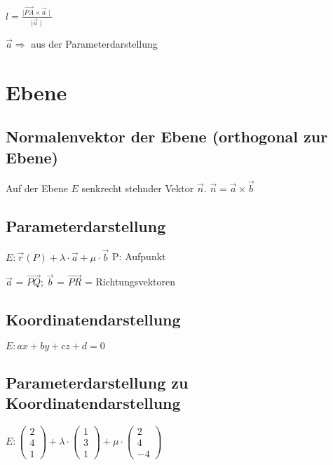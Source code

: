 \begin{multicols*}{3}
    {$l = \frac {\mid \overrightarrow{PA} \times\vec{a}\mid}{\mid\vec{a}\mid} $}

    {\small $\vec{a} \Rightarrow $  aus der Parameterdarstellung}
    \vfill\null
    \columnbreak
    \section{Ebene}

    \subsection{Normalenvektor der Ebene (orthogonal zur Ebene)}
    {Auf der Ebene $ E $ senkrecht stehnder Vektor $\vec{n}$.}
    $\vec{n} = \vec{a} \times \vec{b}$
    \WhiteSpace
    \subsection{Parameterdarstellung}
    {\large $ E: \vec{r}(P) + \lambda \cdot \vec{a} + \mu \cdot \vec{b} $}
    {P: Aufpunkt}

    {$ \vec{a}$ = $\overrightarrow{PQ} $; $ \vec{b}$ = $\overrightarrow{PR} $ = Richtungsvektoren}
    \WhiteSpace
    \subsection{Koordinatendarstellung}
    {$E: ax + by + cz + d = 0 $}

    \subsection{Parameterdarstellung zu Koordinatendarstellung}
    { $ E: \begin{pmatrix}
                2 \\
                4 \\
                1
            \end{pmatrix} + \lambda \cdot
            \begin{pmatrix}
                1 \\
                3 \\
                1
            \end{pmatrix} + \mu \cdot
            \begin{pmatrix}
                2 \\
                4 \\
                -4
            \end{pmatrix}$

}
\end{multicols*}
